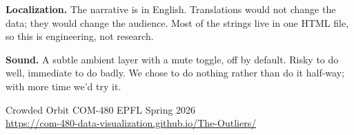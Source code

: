 \documentclass[9pt,a4paper]{article}
\begin{document}
\textbf{Localization.} The narrative is in English. Translations would not change the data; they would change the audience. Most of the strings live in one HTML file, so this is engineering, not research.

\textbf{Sound.} A subtle ambient layer with a mute toggle, off by default. Risky to do well, immediate to do badly. We chose to do nothing rather than do it half-way; with more time we'd try it.

\vspace{2pt}

\begin{center}
{\footnotesize\color{textSec}Crowded Orbit \quad\textbullet\quad COM-480 \quad\textbullet\quad EPFL Spring 2026}\\
{\footnotesize\color{textSec}\url{https://com-480-data-visualization.github.io/The-Outliers/}}
\end{center}
\end{document}
